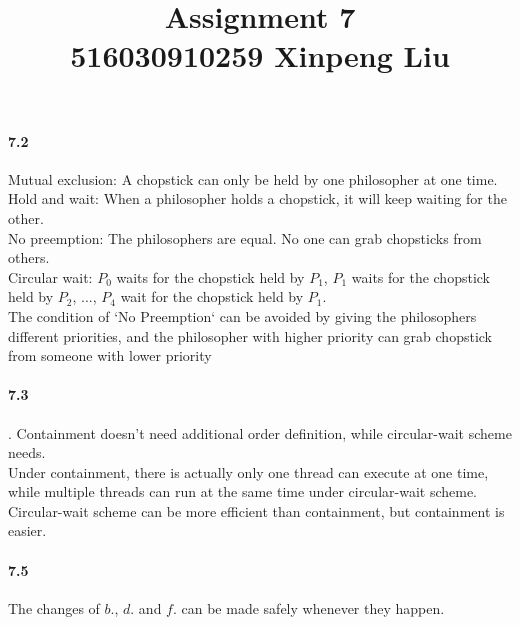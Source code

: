 \documentclass[12pt,a4]{article}
\date{}
\title{
	Assignment 7\\
	\vspace{3mm}
	{\normalsize 516030910259 \textbf{Xinpeng Liu}}
}
\begin{document}
	\maketitle
	\paragraph{7.2}
	Mutual exclusion: A chopstick can only be held by one philosopher at one time.\\
	Hold and wait: When a philosopher holds a chopstick, it will keep waiting for the other.\\
	No preemption: The philosophers are equal. No one can grab chopsticks from others.\\
	Circular wait: $P_0$ waits for the chopstick held by $P_1$, $P_1$ waits for the chopstick held by $P_2$, ..., $P_4$ wait for the chopstick held by $P_1$.\\
	The condition of `No Preemption` can be avoided by giving the philosophers different priorities, and the philosopher with higher priority can grab chopstick from someone with lower priority
	\paragraph{7.3}.
	Containment doesn't need additional order definition, while circular-wait scheme needs.\\
	Under containment, there is actually only one thread can execute at one time, while multiple threads can run at the same time under circular-wait scheme.\\
	Circular-wait scheme can be more efficient than containment, but containment is easier.
	\paragraph{7.5}
	The changes of $b.$, $d.$ and $f.$ can be made safely whenever they happen.
\end{document}
